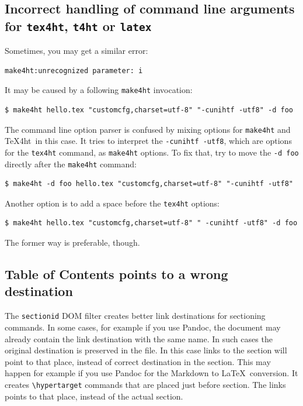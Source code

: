 \subsection{\texorpdfstring{Incorrect handling of command line arguments
for \texttt{tex4ht}, \texttt{t4ht} or
\texttt{latex}}{Incorrect handling of command line arguments for tex4ht, t4ht or latex}}\label{incorrect-handling-of-command-line-arguments-for-tex4ht-t4ht-or-latex}

Sometimes, you may get a similar error:

\begin{verbatim}
make4ht:unrecognized parameter: i
\end{verbatim}

It may be caused by a following \texttt{make4ht} invocation:

\begin{verbatim}
$ make4ht hello.tex "customcfg,charset=utf-8" "-cunihtf -utf8" -d foo
\end{verbatim}

The command line option parser is confused by mixing options for
\texttt{make4ht} and \TeX4ht~in this case. It tries to interpret the
\texttt{-cunihtf\ -utf8}, which are options for the \texttt{tex4ht}
command, as \texttt{make4ht} options. To fix that, try to move the
\texttt{-d\ foo} directly after the \texttt{make4ht} command:

\begin{verbatim}
$ make4ht -d foo hello.tex "customcfg,charset=utf-8" "-cunihtf -utf8"
\end{verbatim}

Another option is to add a space before the \texttt{tex4ht} options:

\begin{verbatim}
$ make4ht hello.tex "customcfg,charset=utf-8" " -cunihtf -utf8" -d foo
\end{verbatim}

The former way is preferable, though.

\subsection{Table of Contents points to a wrong
destination}\label{table-of-contents-points-to-a-wrong-destination}

The \texttt{sectionid} DOM filter creates better link destinations for
sectioning commands. In some cases, for example if you use Pandoc, the
document may already contain the link destination with the same name. In
such cases the original destination is preserved in the file. In this
case links to the section will point to that place, instead of correct
destination in the section. This may happen for example if you use
Pandoc for the Markdown to \LaTeX~conversion. It creates
\texttt{\textbackslash{}hypertarget} commands that are placed just
before section. The links points to that place, instead of the actual
section.

